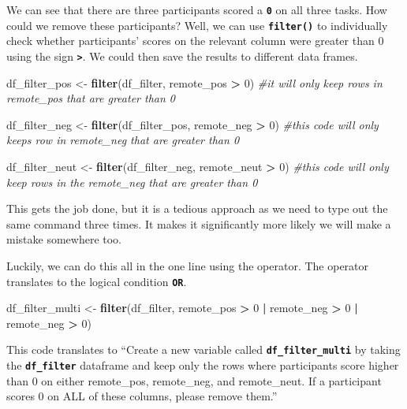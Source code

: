\documentclass[
]{book}
\newenvironment{Shaded}{\begin{snugshade}}{\end{snugshade}}
\newcommand{\CommentTok}[1]{\textcolor[rgb]{0.56,0.35,0.01}{\textit{#1}}}
\newcommand{\DecValTok}[1]{\textcolor[rgb]{0.00,0.00,0.81}{#1}}
\newcommand{\FunctionTok}[1]{\textcolor[rgb]{0.13,0.29,0.53}{\textbf{#1}}}
\newcommand{\NormalTok}[1]{#1}
\newcommand{\OtherTok}[1]{\textcolor[rgb]{0.56,0.35,0.01}{#1}}
\newcommand{\SpecialCharTok}[1]{\textcolor[rgb]{0.81,0.36,0.00}{\textbf{#1}}}
\begin{document}
We can see that there are three participants scored a \textbf{\texttt{0}} on all three tasks. How could we remove these participants? Well, we can use \textbf{\texttt{filter()}} to individually check whether participants' scores on the relevant column were greater than 0 using the sign \textbf{\texttt{\textgreater{}}}. We could then save the results to different data frames.

\begin{Shaded}
\begin{Highlighting}[]
\NormalTok{df\_filter\_pos }\OtherTok{\textless{}{-}} \FunctionTok{filter}\NormalTok{(df\_filter, remote\_pos }\SpecialCharTok{\textgreater{}} \DecValTok{0}\NormalTok{) }\CommentTok{\#it will only keep rows in remote\_pos that are greater than 0}

\NormalTok{df\_filter\_neg }\OtherTok{\textless{}{-}} \FunctionTok{filter}\NormalTok{(df\_filter\_pos, remote\_neg }\SpecialCharTok{\textgreater{}} \DecValTok{0}\NormalTok{) }\CommentTok{\#this code will only keeps row in remote\_neg that are greater than 0}

\NormalTok{df\_filter\_neut }\OtherTok{\textless{}{-}} \FunctionTok{filter}\NormalTok{(df\_filter\_neg, remote\_neut }\SpecialCharTok{\textgreater{}} \DecValTok{0}\NormalTok{) }\CommentTok{\#this code will only keep rows in the remote\_neg that are greater than 0 }
\end{Highlighting}
\end{Shaded}

This gets the job done, but it is a tedious approach as we need to type out the same command three times. It makes it significantly more likely we will make a mistake somewhere too.

Luckily, we can do this all in the one line using the \textbar{} operator. The \textbar{} operator translates to the logical condition \textbf{\texttt{OR}}.

\begin{Shaded}
\begin{Highlighting}[]
\NormalTok{df\_filter\_multi }\OtherTok{\textless{}{-}} \FunctionTok{filter}\NormalTok{(df\_filter, remote\_pos }\SpecialCharTok{\textgreater{}} \DecValTok{0} \SpecialCharTok{|}\NormalTok{ remote\_neg }\SpecialCharTok{\textgreater{}} \DecValTok{0} \SpecialCharTok{|}\NormalTok{ remote\_neg }\SpecialCharTok{\textgreater{}} \DecValTok{0}\NormalTok{)}
\end{Highlighting}
\end{Shaded}

This code translates to ``Create a new variable called \textbf{\texttt{df\_filter\_multi}} by taking the \textbf{\texttt{df\_filter}} dataframe and keep only the rows where participants score higher than 0 on either remote\_pos, remote\_neg, and remote\_neut. If a participant scores 0 on ALL of these columns, please remove them.''
\end{document}
